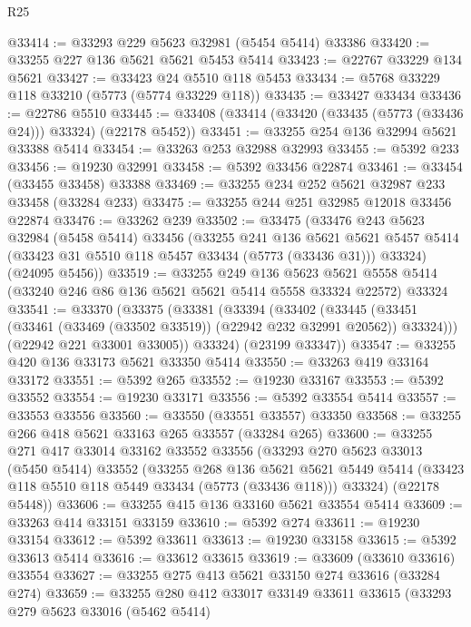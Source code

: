 \begin{lexlean}{R25}
\begin{coremodule}
@33414 := @33293 @229 @5623 @32981 (@5454 @5414) @33386
@33420 := @33255 @227 @136 @5621 @5621 @5453 @5414
@33423 := @22767 @33229 @134 @5621
@33427 := @33423 @24 @5510 @118 @5453
@33434 := @5768 @33229 @118 @33210 (@5773 (@5774 @33229 @118))
@33435 := @33427 @33434
@33436 := @22786 @5510
@33445 := @33408 (@33414 (@33420 (@33435 (@5773 (@33436 @24))) @33324) (@22178 @5452))
@33451 := @33255 @254 @136 @32994 @5621 @33388 @5414
@33454 := @33263 @253 @32988 @32993
@33455 := @5392 @233
@33456 := @19230 @32991
@33458 := @5392 @33456 @22874
@33461 := @33454 (@33455 @33458) @33388
@33469 := @33255 @234 @252 @5621 @32987 @233 @33458 (@33284 @233)
@33475 := @33255 @244 @251 @32985 @12018 @33456 @22874
@33476 := @33262 @239
@33502 := @33475
    (@33476
      @243
      @5623
      @32984
      (@5458 @5414)
      @33456
      (@33255
        @241
        @136
        @5621
        @5621
        @5457
        @5414
        (@33423 @31 @5510 @118 @5457 @33434 (@5773 (@33436 @31)))
        @33324)
      (@24095 @5456))
@33519 := @33255
    @249
    @136
    @5623
    @5621
    @5558
    @5414
    (@33240 @246 @86 @136 @5621 @5621 @5414 @5558 @33324 @22572)
    @33324
@33541 := @33370
    (@33375
      (@33381
        (@33394
          (@33402
            (@33445 (@33451 (@33461 (@33469 (@33502 @33519)) (@22942 @232 @32991 @20562)) @33324)))
          (@22942 @221 @33001 @33005))
        @33324)
      (@23199 @33347))
@33547 := @33255 @420 @136 @33173 @5621 @33350 @5414
@33550 := @33263 @419 @33164 @33172
@33551 := @5392 @265
@33552 := @19230 @33167
@33553 := @5392 @33552
@33554 := @19230 @33171
@33556 := @5392 @33554 @5414
@33557 := @33553 @33556
@33560 := @33550 (@33551 @33557) @33350
@33568 := @33255 @266 @418 @5621 @33163 @265 @33557 (@33284 @265)
@33600 := @33255
    @271
    @417
    @33014
    @33162
    @33552
    @33556
    (@33293
      @270
      @5623
      @33013
      (@5450 @5414)
      @33552
      (@33255
        @268
        @136
        @5621
        @5621
        @5449
        @5414
        (@33423 @118 @5510 @118 @5449 @33434 (@5773 (@33436 @118)))
        @33324)
      (@22178 @5448))
@33606 := @33255 @415 @136 @33160 @5621 @33554 @5414
@33609 := @33263 @414 @33151 @33159
@33610 := @5392 @274
@33611 := @19230 @33154
@33612 := @5392 @33611
@33613 := @19230 @33158
@33615 := @5392 @33613 @5414
@33616 := @33612 @33615
@33619 := @33609 (@33610 @33616) @33554
@33627 := @33255 @275 @413 @5621 @33150 @274 @33616 (@33284 @274)
@33659 := @33255
    @280
    @412
    @33017
    @33149
    @33611
    @33615
    (@33293
      @279
      @5623
      @33016
      (@5462 @5414)

\end{coremodule}
\end{lexlean}
